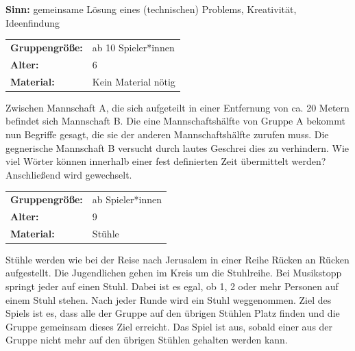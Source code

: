 \textbf{Sinn:} gemeinsame Lösung eines (technischen) Problems, Kreativität, Ideenfindung


\begin{table}[H]
\begin{tabular}{>{\bfseries}lp{8cm}}
   Gruppengröße:   & ab 10 Spieler*innen\\
    Alter: & 6 \\
    Material: & Kein Material nötig \\ 
\end{tabular}
\end{table} 
Zwischen Mannschaft A, die sich aufgeteilt in einer Entfernung von ca. 20 Metern befindet sich Mannschaft B. Die eine Mannschaftshälfte von Gruppe A bekommt nun Begriffe gesagt, die sie der anderen Mannschaftshälfte zurufen muss. Die gegnerische Mannschaft B versucht durch lautes Geschrei dies zu verhindern. Wie viel Wörter können innerhalb einer fest definierten Zeit übermittelt werden? Anschließend wird gewechselt.

\begin{table}[H]
\begin{tabular}{>{\bfseries}lp{8cm}}
   Gruppengröße:   & ab Spieler*innen\\
    Alter: & 9 \\
    Material: & Stühle \\ 
\end{tabular}
\end{table} 

Stühle werden wie bei der Reise nach Jerusalem in einer Reihe Rücken an Rücken aufgestellt. Die Jugendlichen gehen im Kreis um die Stuhlreihe. Bei Musikstopp springt jeder auf einen Stuhl. Dabei ist es egal, ob 1, 2 oder mehr Personen auf einem Stuhl stehen. Nach jeder Runde wird ein Stuhl weggenommen. Ziel des Spiels ist es, dass alle der Gruppe auf den übrigen Stühlen Platz finden und die Gruppe gemeinsam dieses Ziel erreicht. Das Spiel ist aus, sobald einer aus der Gruppe nicht mehr auf den übrigen Stühlen gehalten werden kann.

